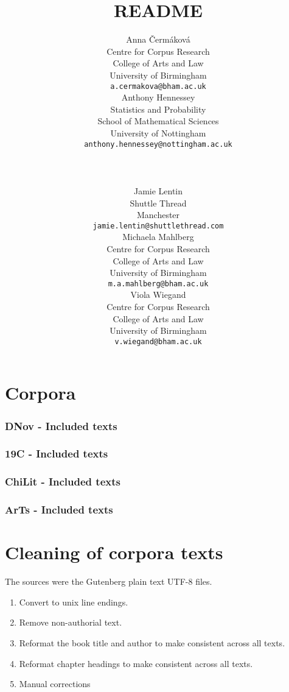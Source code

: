 \documentclass[a4paper,10pt]{paper}
\date{}
\author{
    \scriptsize
    \parbox{0.25\textwidth}{
       \small
       Anna Čermáková \\
       \scriptsize
       Centre for Corpus Research\\ College of Arts and Law\\ University of Birmingham\\
       \texttt{a.cermakova@bham.ac.uk}
    }
    \parbox{0.30\textwidth}{
        \small Anthony Hennessey \\
        \scriptsize
        Statistics and Probability\\ School of Mathematical Sciences\\ University of Nottingham \\
        \texttt{anthony.hennessey@nottingham.ac.uk}
    }
    \\ \\
    \parbox{0.30\textwidth}{
       \small
       Jamie Lentin \\
       \scriptsize
       Shuttle Thread\\ Manchester \\
       \texttt{jamie.lentin@shuttlethread.com}
    }
    \parbox{0.25\textwidth}{
       \small
       Michaela Mahlberg \\
       \scriptsize
       Centre for Corpus Research\\ College of Arts and Law\\ University of Birmingham \\
       \texttt{m.a.mahlberg@bham.ac.uk}
    }
    \parbox{0.25\textwidth}{
       \small
       Viola Wiegand \\
       \scriptsize
       Centre for Corpus Research\\ College of Arts and Law\\ University of Birmingham \\
       \texttt{v.wiegand@bham.ac.uk}
    }
}
\title{README}
\begin{document}
\nocite{*}

\maketitle

\tableofcontents

\section{Corpora}

\printbibliography[heading=none,keyword=corpus]

\subsubsection{DNov - Included texts}

\printbibliography[heading=none,keyword=DNov]

\subsubsection{19C - Included texts}

\printbibliography[heading=none,keyword=19C]

\subsubsection{ChiLit - Included texts}

\printbibliography[heading=none,keyword=ChiLit]

\subsubsection{ArTs - Included texts}

\printbibliography[heading=none,keyword=ArTs]

\section{Cleaning of corpora texts} \label{se:cleaning}
The sources were the Gutenberg plain text UTF-8 files.

\begin{enumerate}
    \item \label{lst:line_endings} Convert to unix line endings.
    \item \label{lst:non_auth} Remove non-authorial text.
    \item \label{lst:title} Reformat the book title and author to make consistent across all texts. 
    \item \label{lst:chapters} Reformat chapter headings to make consistent across all texts. 
    \item \label{lst:manual} Manual corrections
\end{enumerate}
\end{document}
